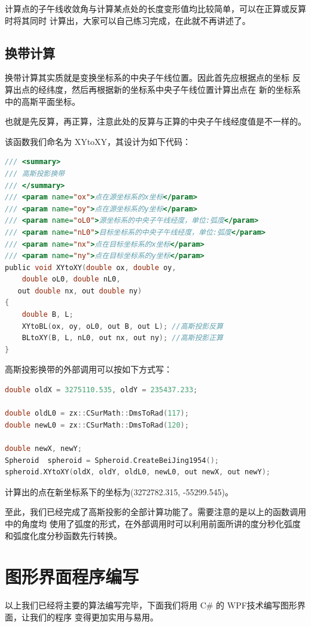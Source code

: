 计算点的子午线收敛角与计算某点处的长度变形值均比较简单，可以在正算或反算时将其同时
计算出，大家可以自己练习完成，在此就不再讲述了。

\subsection{换带计算}
换带计算其实质就是变换坐标系的中央子午线位置。因此首先应根据点的坐标
反算出点的经纬度，然后再根据新的坐标系中央子午线位置计算出点在
新的坐标系中的高斯平面坐标。

也就是先反算，再正算，注意此处的反算与正算的中央子午线经度值是不一样的。

该函数我们命名为 XYtoXY，其设计为如下代码：

\begin{lstlisting}[language=C]
/// <summary>
/// 高斯投影换带
/// </summary>
/// <param name="ox">点在源坐标系的x坐标</param>
/// <param name="oy">点在源坐标系的y坐标</param>
/// <param name="oL0">源坐标系的中央子午线经度，单位:弧度</param>
/// <param name="nL0">目标坐标系的中央子午线经度，单位:弧度</param>
/// <param name="nx">点在目标坐标系的x坐标</param>
/// <param name="ny">点在目标坐标系的y坐标</param>
public void XYtoXY(double ox, double oy,
    double oL0, double nL0,
   out double nx, out double ny)
{
    double B, L;
    XYtoBL(ox, oy, oL0, out B, out L); //高斯投影反算
    BLtoXY(B, L, nL0, out nx, out ny); //高斯投影正算
}
\end{lstlisting}

高斯投影换带的外部调用可以按如下方式写：

\begin{lstlisting}[language=C]
double oldX = 3275110.535, oldY = 235437.233;

double oldL0 = zx::CSurMath::DmsToRad(117);
double newL0 = zx::CSurMath::DmsToRad(120);

double newX, newY;
Spheroid  spheroid = Spheroid.CreateBeiJing1954();
spheroid.XYtoXY(oldX, oldY, oldL0, newL0, out newX, out newY);
\end{lstlisting}

计算出的点在新坐标系下的坐标为(3272782.315, -55299.545)。

至此，我们已经完成了高斯投影的全部计算功能了。需要注意的是以上的函数调用中的角度均
使用了弧度的形式，在外部调用时可以利用前面所讲的度分秒化弧度和弧度化度分秒函数先行转换。

\section{图形界面程序编写}
以上我们已经将主要的算法编写完毕，下面我们将用 C\# 的 WPF技术编写图形界面，让我们的程序
变得更加实用与易用。

